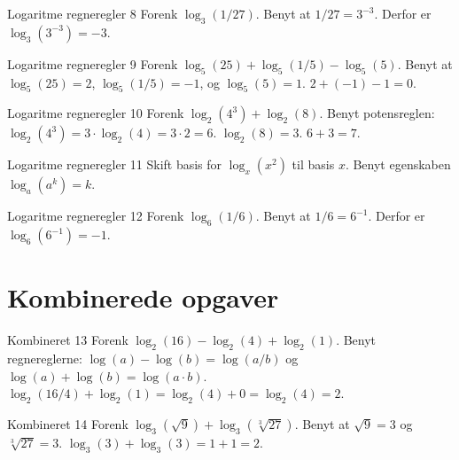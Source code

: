 \documentclass{article}
\begin{document}
\newpage

\begin{exercise}{Logaritme regneregler 8}
Forenk $\log_3(1/27)$.
\hint
Benyt at $1/27 = 3^{-3}$.
\hint
Derfor er $\log_3(3^{-3}) = -3$.
\end{exercise}

\newpage

\begin{exercise}{Logaritme regneregler 9}
Forenk $\log_5(25) + \log_5(1/5) - \log_5(5)$.
\hint
Benyt at $\log_5(25) = 2$, $\log_5(1/5) = -1$, og $\log_5(5) = 1$.
\hint
$2 + (-1) - 1 = 0$.
\end{exercise}

\newpage

\begin{exercise}{Logaritme regneregler 10}
Forenk $\log_2(4^3) + \log_2(8)$.
\hint
Benyt potensreglen: $\log_2(4^3) = 3 \cdot \log_2(4) = 3 \cdot 2 = 6$.
\hint
$\log_2(8) = 3$.
\hint
$6 + 3 = 7$.
\end{exercise}

\newpage

\begin{exercise}{Logaritme regneregler 11}
Skift basis for $\log_{x}(x^2)$ til basis $x$.
\hint
Benyt egenskaben $\log_a(a^k) = k$.
\end{exercise}

\newpage

\begin{exercise}{Logaritme regneregler 12}
Forenk $\log_6(1/6)$.
\hint
Benyt at $1/6 = 6^{-1}$.
\hint
Derfor er $\log_6(6^{-1}) = -1$.
\end{exercise}

\newpage

\section*{Kombinerede opgaver}

\begin{exercise}{Kombineret 13}
Forenk $\log_2(16) - \log_2(4) + \log_2(1)$.
\hint
Benyt regnereglerne: $\log(a) - \log(b) = \log(a/b)$ og $\log(a) + \log(b) = \log(a \cdot b)$.
\hint
$\log_2(16/4) + \log_2(1) = \log_2(4) + 0 = \log_2(4) = 2$.
\end{exercise}

\newpage

\begin{exercise}{Kombineret 14}
Forenk $\log_3(\sqrt{9}) + \log_3(\sqrt[3]{27})$.
\hint
Benyt at $\sqrt{9} = 3$ og $\sqrt[3]{27} = 3$.
\hint
$\log_3(3) + \log_3(3) = 1 + 1 = 2$.
\end{exercise}
\end{document}
